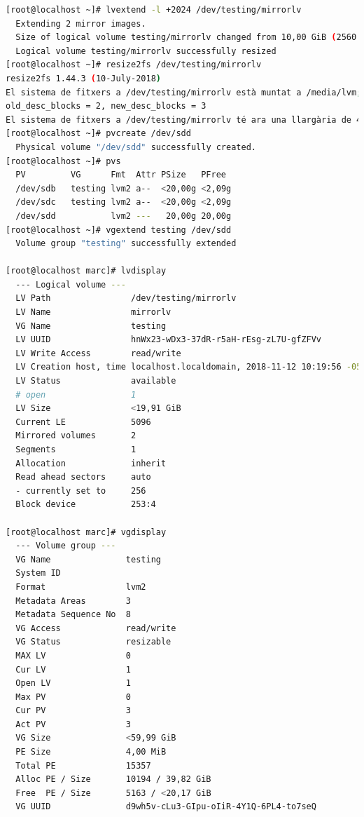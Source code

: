\documentclass[preprint,11pt]{elsarticle}
\begin{document}
\begin{lstlisting}[basicstyle=\tiny, language=bash]
[root@localhost ~]# lvextend -l +2024 /dev/testing/mirrorlv 
  Extending 2 mirror images.
  Size of logical volume testing/mirrorlv changed from 10,00 GiB (2560 extents) to <17,91 GiB (4584 extents).
  Logical volume testing/mirrorlv successfully resized
[root@localhost ~]# resize2fs /dev/testing/mirrorlv 
resize2fs 1.44.3 (10-July-2018)
El sistema de fitxers a /dev/testing/mirrorlv està muntat a /media/lvm; cal un canvi de mida en línia
old_desc_blocks = 2, new_desc_blocks = 3
El sistema de fitxers a /dev/testing/mirrorlv té ara una llargària de 4694016 (4k) blocs.
[root@localhost ~]# pvcreate /dev/sdd 
  Physical volume "/dev/sdd" successfully created.
[root@localhost ~]# pvs
  PV         VG      Fmt  Attr PSize   PFree 
  /dev/sdb   testing lvm2 a--  <20,00g <2,09g
  /dev/sdc   testing lvm2 a--  <20,00g <2,09g
  /dev/sdd           lvm2 ---   20,00g 20,00g
[root@localhost ~]# vgextend testing /dev/sdd 
  Volume group "testing" successfully extended

[root@localhost marc]# lvdisplay 
  --- Logical volume ---
  LV Path                /dev/testing/mirrorlv
  LV Name                mirrorlv
  VG Name                testing
  LV UUID                hnWx23-wDx3-37dR-r5aH-rEsg-zL7U-gfZFVv
  LV Write Access        read/write
  LV Creation host, time localhost.localdomain, 2018-11-12 10:19:56 -0500
  LV Status              available
  # open                 1
  LV Size                <19,91 GiB
  Current LE             5096
  Mirrored volumes       2
  Segments               1
  Allocation             inherit
  Read ahead sectors     auto
  - currently set to     256
  Block device           253:4
   
[root@localhost marc]# vgdisplay 
  --- Volume group ---
  VG Name               testing
  System ID             
  Format                lvm2
  Metadata Areas        3
  Metadata Sequence No  8
  VG Access             read/write
  VG Status             resizable
  MAX LV                0
  Cur LV                1
  Open LV               1
  Max PV                0
  Cur PV                3
  Act PV                3
  VG Size               <59,99 GiB
  PE Size               4,00 MiB
  Total PE              15357
  Alloc PE / Size       10194 / 39,82 GiB
  Free  PE / Size       5163 / <20,17 GiB
  VG UUID               d9wh5v-cLu3-GIpu-oIiR-4Y1Q-6PL4-to7seQ



\end{lstlisting}
\end{document}
